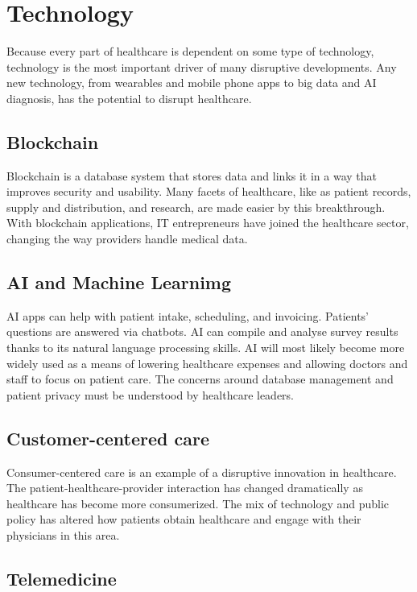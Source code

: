 \documentclass[12pt]{article}
\begin{document}
\section{Technology}
Because every part of healthcare is dependent on some type of technology, technology is the most important driver of many disruptive developments. Any new technology, from wearables and mobile phone apps to big data and AI diagnosis, has the potential to disrupt healthcare.

\subsection{Blockchain}

Blockchain is a database system that stores data and links it in a way that improves security and usability. Many facets of healthcare, like as patient records, supply and distribution, and research, are made easier by this breakthrough. With blockchain applications, IT entrepreneurs have joined the healthcare sector, changing the way providers handle medical data.

\subsection{AI and Machine Learnimg}

AI apps can help with patient intake, scheduling, and invoicing. Patients' questions are answered via chatbots. AI can compile and analyse survey results thanks to its natural language processing skills. AI will most likely become more widely used as a means of lowering healthcare expenses and allowing doctors and staff to focus on patient care. The concerns around database management and patient privacy must be understood by healthcare leaders.

\subsection{Customer-centered care}
Consumer-centered care is an example of a disruptive innovation in healthcare. The patient-healthcare-provider interaction has changed dramatically as healthcare has become more consumerized. The mix of technology and public policy has altered how patients obtain healthcare and engage with their physicians in this area.

\subsection{Telemedicine}
\end{document}
